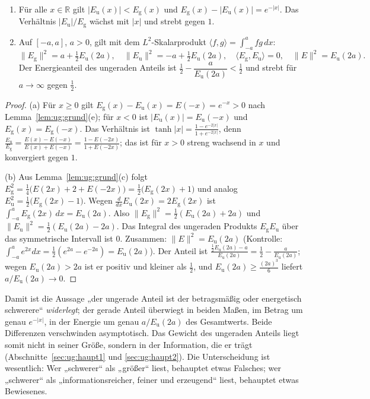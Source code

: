 \begin{satz}[Gewichtsvergleich]\label{satz:ug:gewicht}
\begin{enumerate}[label=(\alph*)]
\item Für alle $x\in\mathbb{R}$ gilt $|E_{\mathrm u}(x)|<E_{\mathrm g}(x)$ und $E_{\mathrm g}(x)-|E_{\mathrm u}(x)|=e^{-|x|}$. Das Verhältnis $|E_{\mathrm u}|/E_{\mathrm g}$ wächst mit $|x|$ und strebt gegen $1$.
\item Auf $[-a,a]$, $a>0$, gilt mit dem $L^2$-Skalarprodukt $\langle f,g\rangle=\int_{-a}^{a}fg\,dx$:
\[
\|E_{\mathrm g}\|^2=a+\tfrac12E_{\mathrm u}(2a),\quad \|E_{\mathrm u}\|^2=-a+\tfrac12E_{\mathrm u}(2a),\quad\langle E_{\mathrm g},E_{\mathrm u}\rangle=0,\quad\|E\|^2=E_{\mathrm u}(2a).
\]
Der Energieanteil des ungeraden Anteils ist $\tfrac12-\dfrac{a}{E_{\mathrm u}(2a)}<\tfrac12$ und strebt für $a\to\infty$ gegen $\tfrac12$.
\end{enumerate}
\end{satz}

\begin{proof}
(a) Für $x\ge0$ gilt $E_{\mathrm g}(x)-E_{\mathrm u}(x)=E(-x)=e^{-x}>0$ nach Lemma~\ref{lem:ug:grund}(e); für $x<0$ ist $|E_{\mathrm u}(x)|=E_{\mathrm u}(-x)$ und $E_{\mathrm g}(x)=E_{\mathrm g}(-x)$. Das Verhältnis ist $\tanh|x|=\frac{1-e^{-2|x|}}{1+e^{-2|x|}}$, denn $\frac{E_{\mathrm u}}{E_{\mathrm g}}=\frac{E(x)-E(-x)}{E(x)+E(-x)}=\frac{1-E(-2x)}{1+E(-2x)}$; das ist für $x>0$ streng wachsend in $x$ und konvergiert gegen $1$.

(b) Aus Lemma~\ref{lem:ug:grund}(c) folgt $E_{\mathrm g}^2=\tfrac14\big(E(2x)+2+E(-2x)\big)=\tfrac12\big(E_{\mathrm g}(2x)+1\big)$ und analog $E_{\mathrm u}^2=\tfrac12\big(E_{\mathrm g}(2x)-1\big)$. Wegen $\frac{d}{dx}E_{\mathrm u}(2x)=2E_{\mathrm g}(2x)$ ist $\int_{-a}^{a}E_{\mathrm g}(2x)\,dx=E_{\mathrm u}(2a)$. Also $\|E_{\mathrm g}\|^2=\tfrac12(E_{\mathrm u}(2a)+2a)$ und $\|E_{\mathrm u}\|^2=\tfrac12(E_{\mathrm u}(2a)-2a)$. Das Integral des ungeraden Produkts $E_{\mathrm g}E_{\mathrm u}$ über das symmetrische Intervall ist $0$. Zusammen: $\|E\|^2=E_{\mathrm u}(2a)$ (Kontrolle: $\int_{-a}^ae^{2x}dx=\tfrac12(e^{2a}-e^{-2a})=E_{\mathrm u}(2a)$). Der Anteil ist $\frac{\frac12E_{\mathrm u}(2a)-a}{E_{\mathrm u}(2a)}=\tfrac12-\frac a{E_{\mathrm u}(2a)}$; wegen $E_{\mathrm u}(2a)>2a$ ist er positiv und kleiner als $\tfrac12$, und $E_{\mathrm u}(2a)\ge\frac{(2a)^3}{6}$ liefert $a/E_{\mathrm u}(2a)\to0$.
\end{proof}

\begin{bemerkung}
Damit ist die Aussage „der ungerade Anteil ist der betragsmäßig oder energetisch schwerere“ \emph{widerlegt}; der gerade Anteil überwiegt in beiden Maßen, im Betrag um genau $e^{-|x|}$, in der Energie um genau $a/E_{\mathrm u}(2a)$ des Gesamtwerts. Beide Differenzen verschwinden asymptotisch. Das Gewicht des ungeraden Anteils liegt somit nicht in seiner Größe, sondern in der Information, die er trägt (Abschnitte~\ref{sec:ug:haupt1} und \ref{sec:ug:haupt2}). Die Unterscheidung ist wesentlich: Wer „schwerer“ als „größer“ liest, behauptet etwas Falsches; wer „schwerer“ als „informationsreicher, feiner und erzeugend“ liest, behauptet etwas Bewiesenes.
\end{bemerkung}

